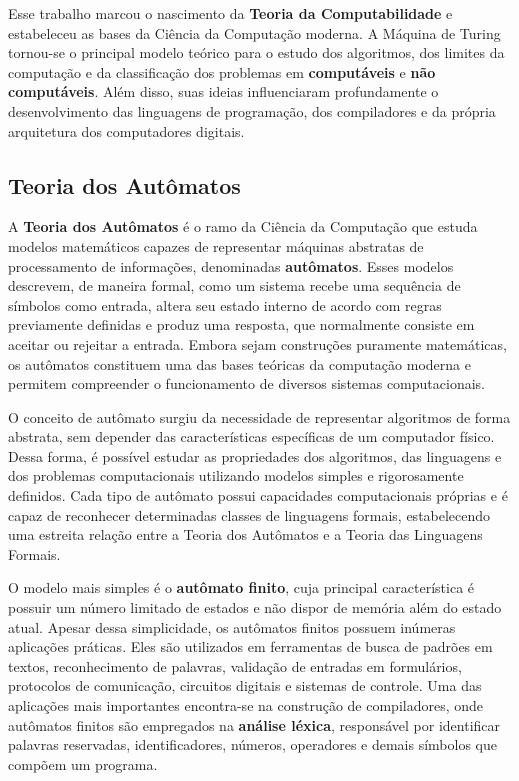 \documentclass[
  brazilian,
  letterpaper,
]{book}
\theoremstyle{plain}
\theoremstyle{definition}
\theoremstyle{remark}
\begin{document}
Esse trabalho marcou o nascimento da \textbf{Teoria da Computabilidade}
e estabeleceu as bases da Ciência da Computação moderna. A Máquina de
Turing tornou-se o principal modelo teórico para o estudo dos
algoritmos, dos limites da computação e da classificação dos problemas
em \textbf{computáveis} e \textbf{não computáveis}. Além disso, suas
ideias influenciaram profundamente o desenvolvimento das linguagens de
programação, dos compiladores e da própria arquitetura dos computadores
digitais.

\subsection{Teoria dos Autômatos}\label{teoria-dos-autuxf4matos}

A \textbf{Teoria dos Autômatos} é o ramo da Ciência da Computação que
estuda modelos matemáticos capazes de representar máquinas abstratas de
processamento de informações, denominadas \textbf{autômatos}. Esses
modelos descrevem, de maneira formal, como um sistema recebe uma
sequência de símbolos como entrada, altera seu estado interno de acordo
com regras previamente definidas e produz uma resposta, que normalmente
consiste em aceitar ou rejeitar a entrada. Embora sejam construções
puramente matemáticas, os autômatos constituem uma das bases teóricas da
computação moderna e permitem compreender o funcionamento de diversos
sistemas computacionais.

O conceito de autômato surgiu da necessidade de representar algoritmos
de forma abstrata, sem depender das características específicas de um
computador físico. Dessa forma, é possível estudar as propriedades dos
algoritmos, das linguagens e dos problemas computacionais utilizando
modelos simples e rigorosamente definidos. Cada tipo de autômato possui
capacidades computacionais próprias e é capaz de reconhecer determinadas
classes de linguagens formais, estabelecendo uma estreita relação entre
a Teoria dos Autômatos e a Teoria das Linguagens Formais.

O modelo mais simples é o \textbf{autômato finito}, cuja principal
característica é possuir um número limitado de estados e não dispor de
memória além do estado atual. Apesar dessa simplicidade, os autômatos
finitos possuem inúmeras aplicações práticas. Eles são utilizados em
ferramentas de busca de padrões em textos, reconhecimento de palavras,
validação de entradas em formulários, protocolos de comunicação,
circuitos digitais e sistemas de controle. Uma das aplicações mais
importantes encontra-se na construção de compiladores, onde autômatos
finitos são empregados na \textbf{análise léxica}, responsável por
identificar palavras reservadas, identificadores, números, operadores e
demais símbolos que compõem um programa.
\end{document}
